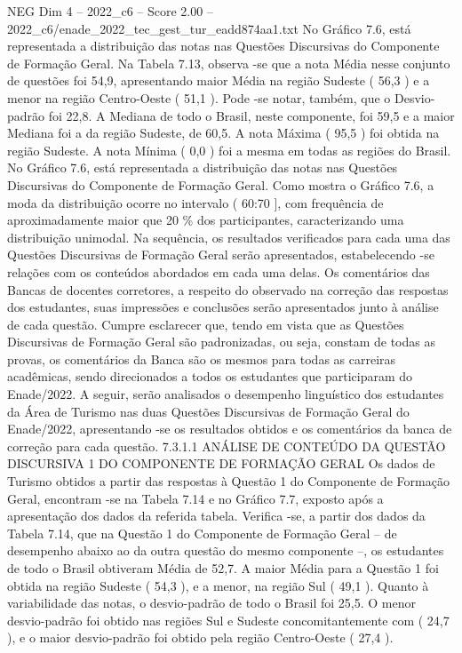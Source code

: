 \begin{textsample}{NEG Dim 4 – 2022\_c6 – Score 2.00 – 2022\_c6/enade\_2022\_tec\_gest\_tur\_eadd874aa1.txt}
No Gráfico 7.6, está representada a distribuição das notas nas Questões Discursivas do Componente de Formação Geral.
Na Tabela 7.13, observa -se que a nota Média nesse conjunto de questões foi 54,9, apresentando maior Média na região Sudeste ( 56,3 ) e a menor na região Centro-Oeste ( 51,1 ).
Pode -se notar, também, que o Desvio-padrão foi 22,8.
A Mediana de todo o Brasil, neste componente, foi 59,5 e a maior Mediana foi a da região Sudeste, de 60,5.
A nota Máxima ( 95,5 ) foi obtida na região Sudeste.
A nota Mínima ( 0,0 ) foi a mesma em todas as regiões do Brasil.
No Gráfico 7.6, está representada a distribuição das notas nas Questões Discursivas do Componente de Formação Geral.
Como mostra o Gráfico 7.6, a moda da distribuição ocorre no intervalo ( 60:70 ], com frequência de aproximadamente maior que 20 \% dos participantes, caracterizando uma distribuição unimodal.
Na sequência, os resultados verificados para cada uma das Questões Discursivas de Formação Geral serão apresentados, estabelecendo -se relações com os conteúdos abordados em cada uma delas.
Os comentários das Bancas de docentes corretores, a respeito do observado na correção das respostas dos estudantes, suas impressões e conclusões serão apresentados junto à análise de cada questão.
Cumpre esclarecer que, tendo em vista que as Questões Discursivas de Formação Geral são padronizadas, ou seja, constam de todas as provas, os comentários da Banca são os mesmos para todas as carreiras acadêmicas, sendo direcionados a todos os estudantes que participaram do Enade/2022.
A seguir, serão analisados o desempenho linguístico dos estudantes da Área de Turismo nas duas Questões Discursivas de Formação Geral do Enade/2022, apresentando -se os resultados obtidos e os comentários da banca de correção para cada questão. 7.3.1.1 ANÁLISE DE CONTEÚDO DA QUESTÃO DISCURSIVA 1 DO COMPONENTE DE FORMAÇÃO GERAL Os dados de Turismo obtidos a partir das respostas à Questão 1 do Componente de Formação Geral, encontram -se na Tabela 7.14 e no Gráfico 7.7, exposto após a apresentação dos dados da referida tabela.
Verifica -se, a partir dos dados da Tabela 7.14, que na Questão 1 do Componente de Formação Geral – de desempenho abaixo ao da outra questão do mesmo componente –, os estudantes de todo o Brasil obtiveram Média de 52,7.
A maior Média para a Questão 1 foi obtida na região Sudeste ( 54,3 ), e a menor, na região Sul ( 49,1 ).
Quanto à variabilidade das notas, o desvio-padrão de todo o Brasil foi 25,5.
O menor desvio-padrão foi obtido nas regiões Sul e Sudeste concomitantemente com ( 24,7 ), e o maior desvio-padrão foi obtido pela região Centro-Oeste ( 27,4 ).

\end{textsample}
